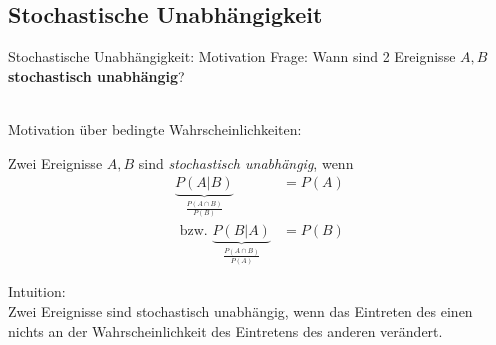 \documentclass[
  10pt,
  ignorenonframetext,
]{beamer}
\begin{document}
\hypertarget{stochastische-unabhuxe4ngigkeit}{%
\subsection{Stochastische
Unabhängigkeit}\label{stochastische-unabhuxe4ngigkeit}}

\begin{frame}{Stochastische Unabhängigkeit: Motivation}
\protect\hypertarget{stochastische-unabhuxe4ngigkeit-motivation}{}
Frage: Wann sind 2 Ereignisse \(A, B\) \textbf{stochastisch
unabhängig}?\\
\strut \\

Motivation über bedingte Wahrscheinlichkeiten:

Zwei Ereignisse \(A, B\) sind \emph{stochastisch unabhängig}, wenn
\begin{align*}
\underbrace{P(A|B)}_{\frac{P(A \cap B)}{P(B)}} & =   P(A)\\
\mbox{ bzw. } \underbrace{P(B|A)}_{\frac{P(A \cap B)}{P(A)}} & =   P(B)
\end{align*}

Intuition:\\
Zwei Ereignisse sind stochastisch unabhängig, wenn das Eintreten des
einen nichts an der Wahrscheinlichkeit des Eintretens des anderen
verändert.
\end{frame}
\end{document}
